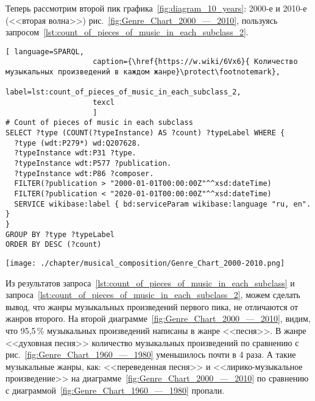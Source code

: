 



Теперь рассмотрим второй пик графика~\ref{fig:diagram_10_years}: 2000-е и 2010-е (<<вторая волна>>) рис.~\ref{fig:Genre_Chart_2000_—_2010}, пользуясь запросом~\ref{lst:count_of_pieces_of_music_in_each_subclass_2}.

\begin{lstlisting}[ language=SPARQL,
                    caption={\href{https://w.wiki/6Vx6}{ Количество музыкальных произведений в каждом жанре}\protect\footnotemark},
                    label=lst:count_of_pieces_of_music_in_each_subclass_2,
                    texcl 
                    ]
# Count of pieces of music in each subclass
SELECT ?type (COUNT(?typeInstance) AS ?count) ?typeLabel WHERE {
  ?type (wdt:P279*) wd:Q207628.
  ?typeInstance wdt:P31 ?type.
  ?typeInstance wdt:P577 ?publication.
  ?typeInstance wdt:P86 ?composer.
  FILTER(?publication > "2000-01-01T00:00:00Z"^^xsd:dateTime)        
  FILTER(?publication < "2020-01-01T00:00:00Z"^^xsd:dateTime)
  SERVICE wikibase:label { bd:serviceParam wikibase:language "ru, en". }
}
GROUP BY ?type ?typeLabel
ORDER BY DESC (?count)
\end{lstlisting}%

\begin{marginfigure}[0\baselineskip]
	\texttt{[image: ./chapter/musical\_composition/Genre\_Chart\_2000-2010.png]}
	\caption[Круговая диаграмма музыкальных жанров за 2000--2010 годы во всем мире]{Круговая диаграмма музыкальных жанров за 2000--2010 годы во всем мире. Ссылка на SPARQL-запрос: \href{https://w.wiki/6Vx6}{https://w.wiki/6Vx6}.}%
	\label{fig:Genre_Chart_2000_—_2010}%
\end{marginfigure}

Из результатов запроса~\ref{lst:count_of_pieces_of_music_in_each_subclass} и запроса~\ref{lst:count_of_pieces_of_music_in_each_subclass_2}, можем сделать вывод, что жанры музыкальных произведений первого пика, не отличаются от жанров второго. На второй диаграмме~\ref{fig:Genre_Chart_2000_—_2010}, видим, что 95,5\,\% музыкальных произведений написаны в жанре <<песня>>. В жанре <<духовная песня>> количество музыкальных произведений по сравнению с рис.~\ref{fig:Genre_Chart_1960_—_1980} уменьшилось почти в 4 раза. А такие музыкальные жанры, как: <<переведенная песня>> и <<лирико-музыкальное произведение>> на диаграмме~\ref{fig:Genre_Chart_2000_—_2010} по сравнению с диаграммой~\ref{fig:Genre_Chart_1960_—_1980} пропали.

